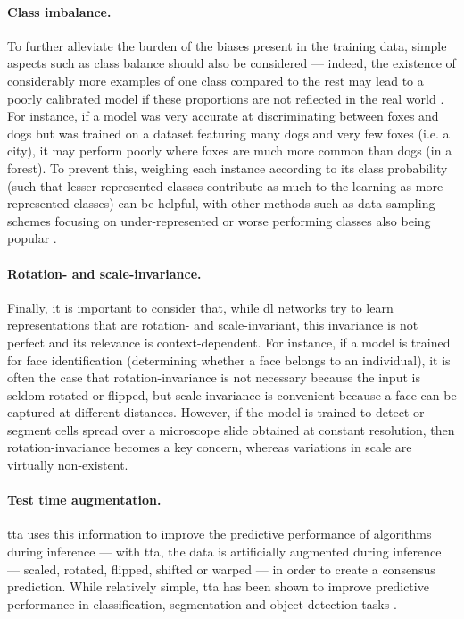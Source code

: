 \paragraph{Class imbalance.} To further alleviate the burden of the biases present in the training data, simple aspects such as class balance should also be considered --- indeed, the existence of considerably more examples of one class compared to the rest may lead to a poorly calibrated model if these proportions are not reflected in the real world \cite{Van_Calster2019-zp}. For instance, if a model was very accurate at discriminating between foxes and dogs but was trained on a dataset featuring many dogs and very few foxes (i.e. a city), it may perform poorly where foxes are much more common than dogs (in a forest). To prevent this, weighing each instance according to its class probability (such that lesser represented classes contribute as much to the learning as more represented classes) can be helpful, with other methods such as data sampling schemes focusing on under-represented or worse performing classes also being popular \cite{Johnson2019-cf}.

\paragraph{Rotation- and scale-invariance.} Finally, it is important to consider that, while \ac{dl} networks try to learn representations that are rotation- and scale-invariant, this invariance is not perfect and its relevance is context-dependent. For instance, if a model is trained for face identification (determining whether a face belongs to an individual), it is often the case that rotation-invariance is not necessary because the input is seldom rotated or flipped, but scale-invariance is convenient because a face can be captured at different distances. However, if the model is trained to detect or segment cells spread over a microscope slide obtained at constant resolution, then rotation-invariance becomes a key concern, whereas variations in scale are virtually non-existent. 

\paragraph{Test time augmentation.} \Ac{tta} uses this information to improve the predictive performance of algorithms during inference --- with \ac{tta}, the data is artificially augmented during inference --- scaled, rotated, flipped, shifted or warped --- in order to create a consensus prediction. While relatively simple, \ac{tta} has been shown to improve predictive performance in classification, segmentation and object detection tasks \cite{Moshkov2020-rc,Shorten2019-hr}.

